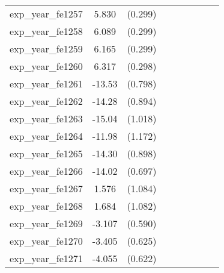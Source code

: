 {\begin{tabular}{l*{4}{cc}}
exp\_year\_fe1257&    5.830\sym{***}&  (0.299)&                  &         &                  &         &                  &         \\
exp\_year\_fe1258&    6.089\sym{***}&  (0.299)&                  &         &                  &         &                  &         \\
exp\_year\_fe1259&    6.165\sym{***}&  (0.299)&                  &         &                  &         &                  &         \\
exp\_year\_fe1260&    6.317\sym{***}&  (0.298)&                  &         &                  &         &                  &         \\
exp\_year\_fe1261&   -13.53\sym{***}&  (0.798)&                  &         &                  &         &                  &         \\
exp\_year\_fe1262&   -14.28\sym{***}&  (0.894)&                  &         &                  &         &                  &         \\
exp\_year\_fe1263&   -15.04\sym{***}&  (1.018)&                  &         &                  &         &                  &         \\
exp\_year\_fe1264&   -11.98\sym{***}&  (1.172)&                  &         &                  &         &                  &         \\
exp\_year\_fe1265&   -14.30\sym{***}&  (0.898)&                  &         &                  &         &                  &         \\
exp\_year\_fe1266&   -14.02\sym{***}&  (0.697)&                  &         &                  &         &                  &         \\
exp\_year\_fe1267&    1.576         &  (1.084)&                  &         &                  &         &                  &         \\
exp\_year\_fe1268&    1.684         &  (1.082)&                  &         &                  &         &                  &         \\
exp\_year\_fe1269&   -3.107\sym{***}&  (0.590)&                  &         &                  &         &                  &         \\
exp\_year\_fe1270&   -3.405\sym{***}&  (0.625)&                  &         &                  &         &                  &         \\
exp\_year\_fe1271&   -4.055\sym{***}&  (0.622)&                  &         &                  &         &                  &         \\

\end{tabular}}

